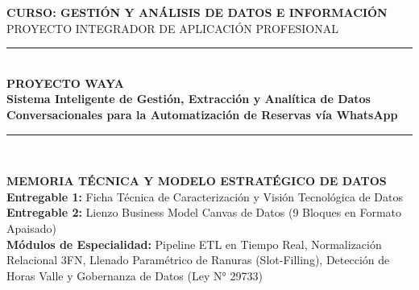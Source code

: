 \documentclass[12pt,a4paper]{report}
\begin{document}
\begin{titlepage}
    \centering
    \vspace*{0.5cm}
    
    {\Large \textbf{\textsf{CURSO: GESTIÓN Y ANÁLISIS DE DATOS E INFORMACIÓN}}}\\[0.3cm]
    {\large \textsf{PROYECTO INTEGRADOR DE APLICACIÓN PROFESIONAL}}\\[1.0cm]
    
    \rule{\textwidth}{1.5pt}\\[0.4cm]
    {\Huge \bfseries \color{BrandPrimary} PROYECTO WAYA}\\[0.3cm]
    {\Large \textbf{Sistema Inteligente de Gestión, Extracción y Analítica de Datos Conversacionales para la Automatización de Reservas vía WhatsApp}}\\[0.2cm]
    \rule{\textwidth}{1.5pt}\\[1.0cm]
    
    \begin{tcolorbox}[enhanced, colback=SurfaceLight, colframe=BrandPrimary, arc=4mm, width=0.96\textwidth, boxrule=1.2pt]
        \centering
        \vspace{0.2cm}
        {\large \bfseries MEMORIA TÉCNICA Y MODELO ESTRATÉGICO DE DATOS}\\[0.2cm]
        {\small \textbf{Entregable 1:} Ficha Técnica de Caracterización y Visión Tecnológica de Datos\\
        \textbf{Entregable 2:} Lienzo Business Model Canvas de Datos (9 Bloques en Formato Apaisado)\\
        \textbf{Módulos de Especialidad:} Pipeline ETL en Tiempo Real, Normalización Relacional 3FN, Llenado Paramétrico de Ranuras (Slot-Filling), Detección de Horas Valle y Gobernanza de Datos (Ley N° 29733)}\\[0.2cm]
    \end{tcolorbox}
    
    \vfill
    

\end{titlepage}
\end{document}

